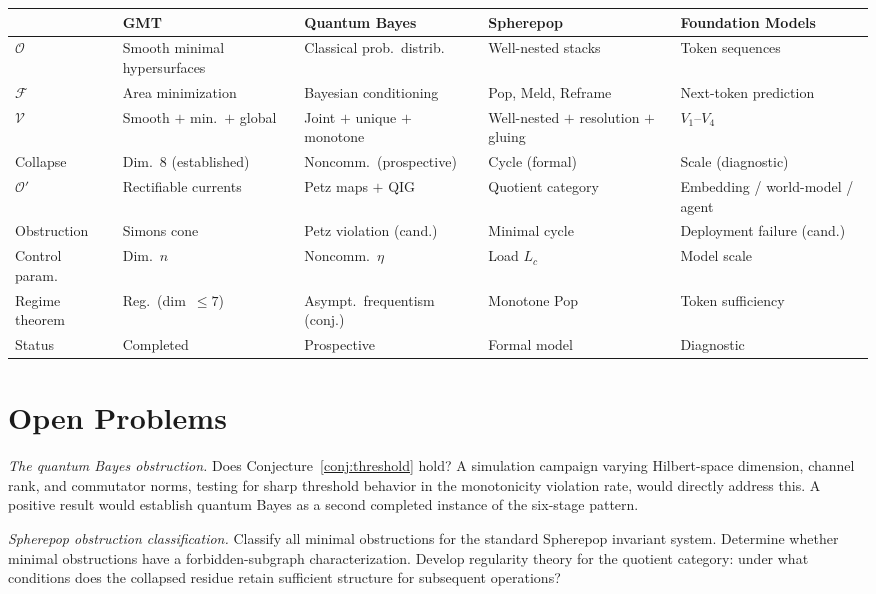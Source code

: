 \documentclass[12pt,oneside]{book}
\theoremstyle{plain}
\theoremstyle{definition}
\theoremstyle{remark}
\newcommand{\Oold}{\mathcal{O}}
\newcommand{\Onew}{\mathcal{O}'}
\newcommand{\F}{\mathcal{F}}
\begin{document}
\begin{center}
\renewcommand{\arraystretch}{1.3}
\begin{tabular}{p{1.6cm}p{2.6cm}p{2.6cm}p{2.6cm}p{2.6cm}}
\toprule
& \textbf{GMT} & \textbf{Quantum Bayes} & \textbf{Spherepop}
  & \textbf{Foundation Models} \\
\midrule
$\Oold$ & Smooth minimal hypersurfaces & Classical prob.\ distrib.
  & Well-nested stacks & Token sequences \\
$\F$ & Area minimization & Bayesian conditioning
  & Pop, Meld, Reframe & Next-token prediction \\
$\mathcal{V}$ & Smooth $+$ min.\ $+$ global
  & Joint $+$ unique $+$ monotone
  & Well-nested $+$ resolution $+$ gluing
  & $V_1$--$V_4$ \\
Collapse & Dim.\ 8 (established)
  & Noncomm.\ (prospective)
  & Cycle (formal)
  & Scale (diagnostic) \\
$\Onew$ & Rectifiable currents
  & Petz maps $+$ QIG
  & Quotient category
  & Embedding / world-model / agent \\
Obstruction & Simons cone
  & Petz violation (cand.)
  & Minimal cycle
  & Deployment failure (cand.) \\
Control param. & Dim.\ $n$
  & Noncomm.\ $\eta$
  & Load $L_c$
  & Model scale \\
Regime theorem & Reg.\ (dim~$\leq 7$)
  & Asympt.\ frequentism (conj.)
  & Monotone Pop
  & Token sufficiency \\
Status & Completed & Prospective & Formal model & Diagnostic \\
\bottomrule
\end{tabular}
\end{center}

\section{Open Problems}

\emph{The quantum Bayes obstruction.} Does Conjecture~\ref{conj:threshold}
hold? A simulation campaign varying Hilbert-space dimension, channel rank,
and commutator norms, testing for sharp threshold behavior in the monotonicity
violation rate, would directly address this. A positive result would establish
quantum Bayes as a second completed instance of the six-stage pattern.

\emph{Spherepop obstruction classification.} Classify all minimal obstructions
for the standard Spherepop invariant system. Determine whether minimal
obstructions have a forbidden-subgraph characterization. Develop regularity
theory for the quotient category: under what conditions does the collapsed
residue retain sufficient structure for subsequent operations?
\end{document}
